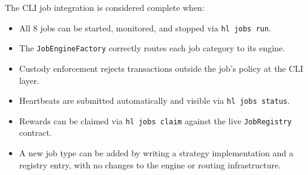 \documentclass[11pt,a4paper]{article}
\begin{document}
\begin{successbox}
The CLI job integration is considered complete when:
\begin{itemize}[leftmargin=2em]
  \item All 8 jobs can be started, monitored, and stopped via \texttt{hl jobs run}.
  \item The \texttt{JobEngineFactory} correctly routes each job category to its engine.
  \item Custody enforcement rejects transactions outside the job's policy at the CLI layer.
  \item Heartbeats are submitted automatically and visible via \texttt{hl jobs status}.
  \item Rewards can be claimed via \texttt{hl jobs claim} against the live \texttt{JobRegistry} contract.
  \item A new job type can be added by writing a strategy implementation and a registry entry, with no changes to the engine or routing infrastructure.
\end{itemize}
\end{successbox}
\end{document}
